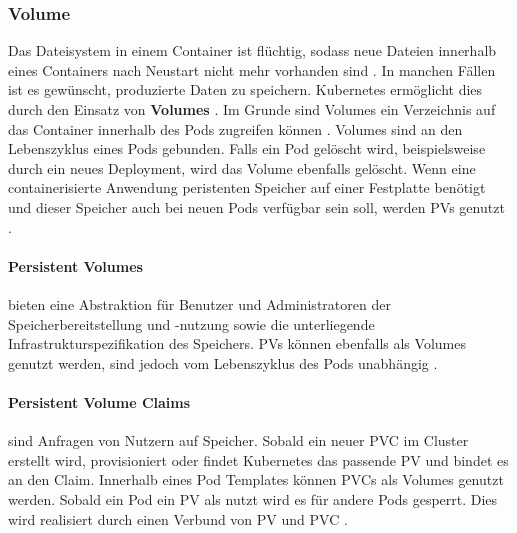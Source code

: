 \subsubsection{Volume}
\label{subsec:kubernetes:volume}
Das Dateisystem in einem Container ist flüchtig, 
sodass neue Dateien innerhalb eines Containers nach Neustart nicht mehr vorhanden sind \cite{kubernetesVolumes}.
In manchen Fällen ist es gewünscht, produzierte Daten zu speichern.
Kubernetes ermöglicht dies durch den Einsatz von \textbf{Volumes} \cite{Marko2018}.
Im Grunde sind Volumes ein Verzeichnis auf das Container innerhalb des Pods zugreifen können \cite{kubernetesVolumes}.
Volumes sind an den Lebenszyklus eines Pods gebunden. Falls ein Pod gelöscht wird, beispielsweise durch ein neues Deployment,
wird das Volume ebenfalls gelöscht.
Wenn eine containerisierte Anwendung peristenten Speicher auf einer Festplatte benötigt und dieser Speicher auch bei neuen Pods verfügbar sein soll,
werden \acp{PV} genutzt \cite{Marko2018}.

\paragraph{Persistent Volumes}
bieten eine Abstraktion für Benutzer und Administratoren der Speicherbereitstellung und -nutzung sowie
die unterliegende Infrastrukturspezifikation des Speichers.
\acp{PV} können ebenfalls als Volumes genutzt werden,
sind jedoch vom Lebenszyklus des Pods unabhängig \cite{kubernetesPV}.

\paragraph{Persistent Volume Claims}
sind Anfragen von Nutzern auf Speicher. 
Sobald ein neuer \ac{PVC} im Cluster erstellt wird, provisioniert oder findet Kubernetes das
passende \ac{PV} und bindet es an den Claim.
Innerhalb eines Pod Templates können \acp{PVC} als Volumes genutzt werden.
Sobald ein Pod ein \ac{PV} als nutzt wird es für andere Pods gesperrt. 
Dies wird realisiert durch einen Verbund von \ac{PV} und \ac{PVC} \cite{Marko2018}.
